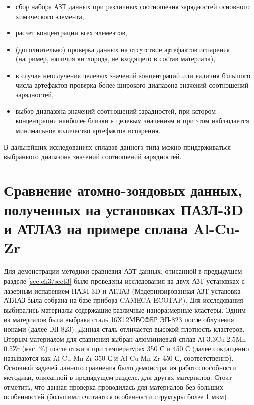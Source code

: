 \begin{itemize}
	\item сбор набора АЗТ данных при различных соотношения зарядностей основного химического элемента,
	\item расчет концентрации всех элементов,	
	\item (дополнительно) проверка данных на отсутствие артефактов испарения (например, наличия кислорода, не входящего в состав материала),
	\item в случае неполучения целевых значений концентраций или наличия большого числа артефактов проверка более широкого диапазона значений соотношений зарядностей,
	\item выбор диапазона значений соотношений зарадностей, при котором концентрации наиболее близки к целевым значениям и при этом наблюдается минимальное количество артефактов испарения.	
\end{itemize}
В дальнейших исследованиях сплавов данного типа можно придерживаться выбранного диапазона значений соотношений зарядностей.

\FloatBarrier

\section{Сравнение атомно-зондовых данных, полученных на установках ПАЗЛ-3D и АТЛАЗ на примере сплава Al-Cu-Zr}\label{sec:ch3/sect4}

Для демонстрации методики сравнения АЗТ данных, описанной в предыдущем разделе \cref{sec:ch3/sect3} было проведены исследования на двух АЗТ установках с лазерным испарением ПАЗЛ-3D и АТЛАЗ (Модернизированная АЗТ установка АТЛАЗ была собрана на базе прибора CAMECA ECOTAP). Для исследования выбирались материалы содержащие различные наноразмерные кластеры. Одним из материалов была выбрана сталь 16Х12МВСФБР ЭП-823 \cite{Porollo04} после облучения ионами (далее ЭП-823). Данная сталь отличается высокой плотность кластеров. Вторым материалом для сравнения выбран алюминиевый сплав Al-3.3Cu-2.5Mn-0.5Zr (мас. \%) после отжига при температурах 350 \textdegree С и 450 \textdegree С \cite{Belov22,Belov21} (далее сокращенно называются как Al-Cu-Mn-Zr 350 \textdegree С и Al-Cu-Mn-Zr 450 \textdegree С, соответственно). Основной задачей данного сравнения было демонстрация работоспособности методики, описанной в предыдущем разделе, для других материалов. Стоит отметить, что данная проверка проводилась для материалов без больших особенностей (большими считаются особенности структуры более 1 мкм). 

